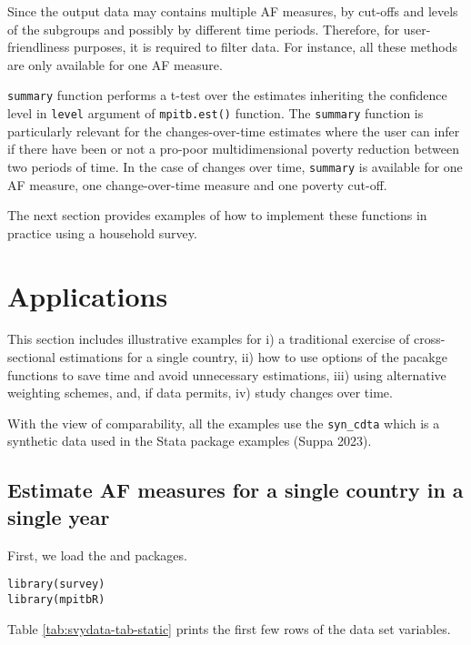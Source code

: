 Since the output data may contains multiple AF measures, by cut-offs and
levels of the subgroups and possibly by different time periods.
Therefore, for user-friendliness purposes, it is required to filter
data. For instance, all these methods are only available for one AF
measure.

\texttt{summary} function performs a t-test over the estimates inheriting the
confidence level in \texttt{level} argument of \texttt{mpitb.est()} function. The
\texttt{summary} function is particularly relevant for the changes-over-time
estimates where the user can infer if there have been or not a pro-poor
multidimensional poverty reduction between two periods of time. In the
case of changes over time, \texttt{summary} is available for one AF measure,
one change-over-time measure and one poverty cut-off.

The next section provides examples of how to implement these functions
in practice using a household survey.

\hypertarget{applications}{%
\section{Applications}\label{applications}}

This section includes illustrative examples for i) a traditional
exercise of cross-sectional estimations for a single country, ii) how to use options of the pacakge functions to save time and avoid unnecessary estimations, iii) using alternative
weighting schemes, and, if data permits, iv) study changes over time.

With the view of comparability, all the examples use the \texttt{syn\_cdta}
which is a synthetic data used in the Stata package examples
(Suppa 2023).

\hypertarget{estimate-af-measures-for-a-single-country-in-a-single-year}{%
\subsection{Estimate AF measures for a single country in a single year}\label{estimate-af-measures-for-a-single-country-in-a-single-year}}

First, we load the  and  packages.

\begin{verbatim}
library(survey)
library(mpitbR)
\end{verbatim}

Table
\ref{tab:svydata-tab-static}
prints the first few rows of the data set variables.

